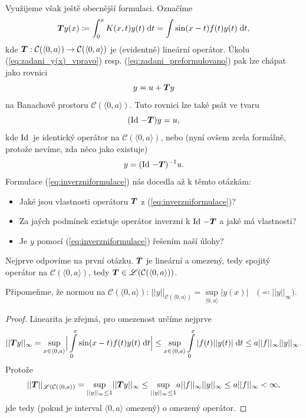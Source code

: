 Využijeme však ještě obecnější formulaci. Označíme
\begin{equation}
     \boldsymbol{T} y(x)\coloneqq \int_0^x K(x,t)y(t)\;\mathrm{d}t=\int\limits\sin(x-t)f(t)y(t)\;\mathrm{d}t,
    \label{eq:obesnejsiformulaceTy}
\end{equation}
kde $ \boldsymbol{T} : \mathcal{C}(\langle 0,a\rangle )\rightarrow \mathcal{C}(\langle 0,a\rangle )$ je (evidentně) lineární operátor. Úkolu (\ref{eq:zadani_y(x)_vpravo}) resp. (\ref{eq:zadani_preformulovano}) pak lze chápat jako rovnici
\begin{equation}
    y=u+ \boldsymbol{T} y
\end{equation}
na Banachově prostoru $\mathcal{C}(\langle 0,a\rangle)$. Tuto rovnici lze také psát ve tvaru
\begin{equation}
    (\operatorname{Id}\,- \boldsymbol{T} )y=u,
\end{equation}
kde $\operatorname{Id}\,$ je identický operátor na $\mathcal{C}(\langle 0,a\rangle)$, nebo (nyní ovšem zcela formálně, protože nevíme, zda něco jako  existuje)
\begin{equation}
    y = (\operatorname{Id}\,- \boldsymbol{T} )^{-1}u.
    \label{eq:inverzniformulace}
\end{equation}
Formulace (\ref{eq:inverzniformulace}) nás docedla až k těmto otázkám:
\begin{itemize}
    \item Jaké jsou vlastnosti operátoru $ \boldsymbol{T} $ z (\ref{eq:inverzniformulace})?
    \item Za jaých podmínek existuje operátor inverzní k $\operatorname{Id}\,- \boldsymbol{T} $ a jaké má vlastnosti?
    \item Je $y$  pomocí (\ref{eq:inverzniformulace}) řešením naší úlohy?
\end{itemize}
Nejprve odpovíme na první otázku. $ \boldsymbol{T} $ je lineární a omezený, tedy spojitý operátor na $\mathcal{C}(\langle0,a\rangle)$, tedy $ \boldsymbol{T} \in\mathscr{L}(\mathcal{C}(\langle0,a\rangle))$.

Připomeňme, že normou na $\mathcal{C}(\langle0,a\rangle)$: $||y||_{\mathcal{C}(\langle0,a\rangle)} = \underset{\langle 0,a\rangle}{\sup} |y(x)| \quad \big(\eqqcolon ||y||_\infty\big)$.

\begin{proof}
Linearita je zřejmá, pro omezenost určíme nejprve
\begin{equation}
    || \boldsymbol{T} y||_\infty = \underset{x\in\langle0,a\rangle}{\sup}\Big|\int\limits_0^x\sin(x-t)f(t)y(t)\;\mathrm{d}t\Big|\leq \underset{x\in\langle0,a\rangle}{\sup}\int\limits_0^x|f(t)||y(t)|\;\mathrm{d}t\leq a||f||_\infty||y||_\infty.
\end{equation}
Protože  
\begin{equation}
    || \boldsymbol{T} ||_{\mathscr{L}(\mathcal{C}(\langle0,a\rangle)} = \underset{||y||_\infty\leq1}{\sup}|| \boldsymbol{T} y||_\infty\leq \underset{||y||_\infty\leq1}{\sup} a ||f||_\infty ||y||_\infty\leq a||f||_\infty<\infty,
    \label{eq:omezeniOperatoru}
\end{equation}
jde tedy (pokud je interval $\langle0,a\rangle$ omezený) o omezený operátor.
\end{proof}

